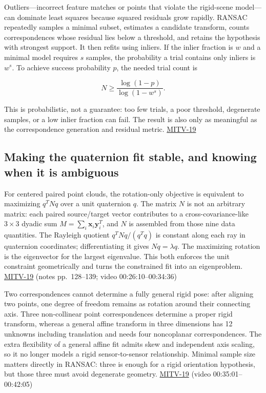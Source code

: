 Outliers---incorrect feature matches or points that violate the rigid-scene model---can dominate least squares because squared residuals grow rapidly. RANSAC repeatedly samples a minimal subset, estimates a candidate transform, counts correspondences whose residual lies below a threshold, and retains the hypothesis with strongest support. It then refits using inliers. If the inlier fraction is \(w\) and a minimal model requires \(s\) samples, the probability a trial contains only inliers is \(w^s\). To achieve success probability \(p\), the needed trial count is

\[
N\ge\frac{\log(1-p)}{\log(1-w^s)}.
\]

This is probabilistic, not a guarantee: too few trials, a poor threshold, degenerate samples, or a low inlier fraction can fail. The result is also only as meaningful as the correspondence generation and residual metric. \hyperref[04-visual-computing-ii-ch036-mitv-19---absolute-orientation-in-closed-form-outliers-and-robustness-ransac]{MITV-19}

\subsection{Making the quaternion fit stable, and knowing when it is ambiguous}\label{04-visual-computing-ii-ch032-making-the-quaternion-fit-stable-and-knowing-when-it-is-ambiguous}

\hypertarget{04-visual-computing-ii-ch032-making-the-quaternion-fit-stable-and-knowing-when-it-is-ambiguous}{}

For centered paired point clouds, the rotation-only objective is equivalent to maximizing \(q^TNq\) over a unit quaternion \(q\). The matrix \(N\) is not an arbitrary matrix: each paired source/target vector contributes to a cross-covariance-like \(3\times3\) dyadic sum \(M=\sum_i \mathbf{x}_i\mathbf{y}_i^T\), and \(N\) is assembled from those nine data quantities. The Rayleigh quotient \(q^TNq/(q^Tq)\) is constant along each ray in quaternion coordinates; differentiating it gives \(Nq=\lambda q\). The maximizing rotation is the eigenvector for the largest eigenvalue. This both enforces the unit constraint geometrically and turns the constrained fit into an eigenproblem. \hyperref[04-visual-computing-ii-ch036-mitv-19---absolute-orientation-in-closed-form-outliers-and-robustness-ransac]{MITV-19} (notes pp.~128--139; video 00:26:10--00:34:36)

Two correspondences cannot determine a fully general rigid pose: after aligning two points, one degree of freedom remains as rotation around their connecting axis. Three non-collinear point correspondences determine a proper rigid transform, whereas a general affine transform in three dimensions has 12 unknowns including translation and needs four noncoplanar correspondences. The extra flexibility of a general affine fit admits skew and independent axis scaling, so it no longer models a rigid sensor-to-sensor relationship. Minimal sample size matters directly in RANSAC: three is enough for a rigid orientation hypothesis, but those three must avoid degenerate geometry. \hyperref[04-visual-computing-ii-ch036-mitv-19---absolute-orientation-in-closed-form-outliers-and-robustness-ransac]{MITV-19} (video 00:35:01--00:42:05)

